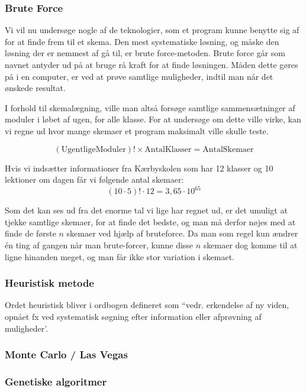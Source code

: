 \subsubsection{Brute Force}
Vi vil nu undersøge nogle af de teknologier, som et program kunne benytte sig af for at finde frem til et skema. Den mest systematiske løsning, og måske den løsning der er nemmest af gå til, er brute force-metoden. Brute force går som navnet antyder ud på at bruge rå kraft for at finde løsningen. Måden dette gøres på i en computer, er ved at prøve samtlige muligheder, indtil man når det ønskede resultat.

I forhold til skemalægning, ville man altså forsøge samtlige sammensætninger af moduler i løbet af ugen, for alle klasse. For at undersøge om dette ville virke, kan vi regne ud hvor mange skemaer et program maksimalt ville skulle teste.

$$ (\text{UgentligeModuler})! \times \text{AntalKlasser} = \text{AntalSkemaer}$$

Hvis vi indsætter informationer fra Kærbyskolen som har 12 klasser og 10 lektioner om dagen får vi følgende antal skemaer:
$$ (10\cdot 5)! \cdot 12 = 3,65\cdot 10^{65} $$

Som det kan ses ud fra det enorme tal vi lige har regnet ud, er det umuligt at tjekke samtlige skemaer, for at finde det bedste, og man må derfor nøjes med at finde de første $n$ skemaer ved hjælp af bruteforce. Da man som regel kun ændrer \'en ting af gangen når man brute-forcer, kunne disse $n$ skemaer dog komme til at ligne hinanden meget, og man får ikke stor variation i skemaet.

\subsubsection{Heuristisk metode}
Ordet heuristisk bliver i ordbogen defineret som ``vedr. erkendelse af ny viden, opnået fx ved systematisk søgning efter information eller afprøvning af muligheder'\cite{Ordnet}.

\subsubsection{Monte Carlo / Las Vegas}

\subsubsection{Genetiske algoritmer}
